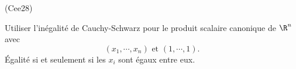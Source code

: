 \begin{tiny}(Cee28)\end{tiny} Utiliser l'inégalité de Cauchy-Schwarz pour le produit scalaire canonique de $\R^n$ avec 
\[
 (x_1,\cdots,x_n) \text{ et } (1,\cdots,1).
\]
\'Egalité si et seulement si les $x_i$ sont égaux entre eux.